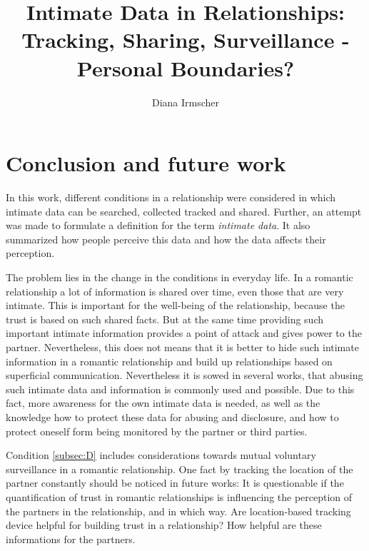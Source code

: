 \documentclass[journal]{vgtc}                %
\title{Intimate Data in Relationships: Tracking, Sharing, Surveillance - Personal Boundaries?}
\author{Diana Irmscher}
\begin{document}

\maketitle

%
%












\section{Conclusion and future work}
\label{sec:conculsion}
In this work, different conditions in a relationship  were considered in which intimate data can be searched, collected tracked and shared.
Further, an attempt was made to formulate a definition for the term \textit{intimate data}. It also summarized how people perceive this data and how the data affects their perception.



The problem lies in the change in the conditions in everyday life.
In a romantic relationship a lot of information is shared over time, even those that are very intimate. This is important for the well-being of the relationship, because the trust is based on such shared facts. But at the same time providing such important intimate information provides a point of attack and gives power to the partner. Nevertheless, this does not means that it is better to hide such intimate information in a romantic relationship and build up relationships based on superficial communication.
Nevertheless it is sowed in several works, that abusing such intimate data and information is commonly used and possible. Due to this fact, more awareness for the own intimate data is needed, as well as the knowledge how to protect these data for abusing and disclosure, and how to protect oneself form being monitored by the partner or third parties.

Condition \ref{subsec:D} includes considerations towards mutual voluntary surveillance in a romantic relationship. One fact by tracking the location of the partner constantly should be noticed in future works: It is questionable if the quantification of trust in romantic relationships is influencing the perception of the partners in the relationship, and in which way. Are location-based tracking device helpful for building trust in a relationship? How helpful are these informations for the partners.



\printbibliography
\end{document}
